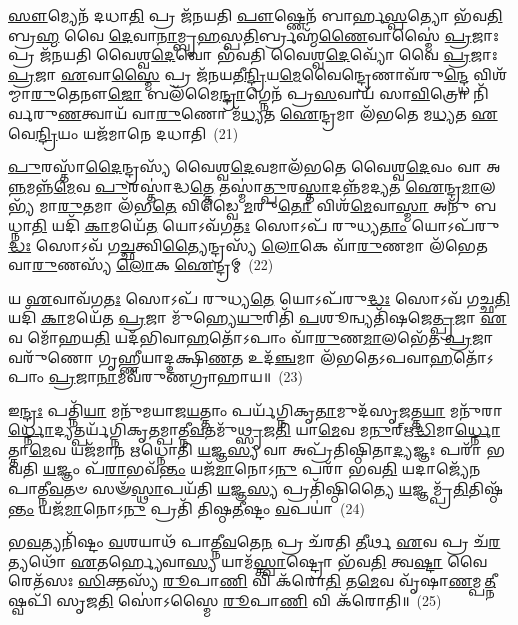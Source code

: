 \-\ul{𑌸𑍗}\-𑌮𑍍𑌯𑍇𑌨᳴ 𑌦𑌧𑌾\-\ul{𑌤𑌿} 𑌪𑍍𑌰 𑌜᳴𑌨𑌯𑌤𑌿 \ul{𑌪𑍗}\-𑌷𑍍𑌣𑍇𑌨᳴ 𑌬𑌾𑌰𑍍\mbox{}𑌹\-\ul{𑌸𑍍𑌪}\-𑌤𑍍𑌯𑍋 𑌭᳴𑌵\-\ul{𑌤𑌿} 𑌬𑍍𑌰\-\ul{𑌹𑍍𑌮} 𑌵𑍈 \ul{𑌦𑍇}\-𑌵𑌾\-\ul{𑌨𑌾}\-𑌮𑍍𑌬𑍃\-\ul{𑌹}\-𑌸𑍍𑌪\-\ul{𑌤𑌿}\-𑌰𑍍𑌬𑍍𑌰𑌹𑍍𑌮᳴\-\ul{𑌣𑍈}\-𑌵𑌾𑌸𑍍𑌮𑍈॑ \ul{𑌪𑍍𑌰}\-𑌜𑌾𑌃 𑌪𑍍𑌰 𑌜᳴𑌨𑌯𑌤𑌿 𑌵𑍈𑌶𑍍𑌵\-\ul{𑌦𑍇}\-𑌵𑍋 𑌭᳴𑌵𑌤𑌿 𑌵𑍈𑌶𑍍𑌵\-\ul{𑌦𑍇}\-𑌵𑍍𑌯𑍋᳴ 𑌵𑍈 \ul{𑌪𑍍𑌰}\-𑌜𑌾𑌃 \ul{𑌪𑍍𑌰}\-𑌜𑌾 \ul{𑌏}\-𑌵𑌾\-\ul{𑌸𑍍𑌮𑍈} 𑌪𑍍𑌰 𑌜᳴𑌨𑌯𑌤𑍀\-\ul{𑌨𑍍𑌦𑍍𑌰𑌿}\-𑌯\-\ul{𑌮𑍇}\-𑌵𑍈𑌨𑍍𑌦𑍍𑌰𑍇𑌣𑌾𑌵᳴𑌰𑍁\-\ul{𑌨𑍍𑌦𑍍𑌧𑍇} 𑌵𑌿𑌶᳴𑌮𑍍𑌮𑌾\-\ul{𑌰𑍁}\-𑌤𑍇𑌨𑍗\-\ul{𑌜𑍋} 𑌬𑌲᳴𑌮𑍈\-\ul{𑌨𑍍𑌦𑍍𑌰𑌾}\-𑌗𑍍𑌨𑍇𑌨᳴ 𑌪𑍍𑌰\-\ul{𑌸}\-𑌵𑌾𑌯᳴ 𑌸𑌾\-\ul{𑌵𑌿}\-𑌤𑍍𑌰𑍋 𑌨𑌿᳴𑌰𑍍𑌵𑌰𑍁\-\ul{𑌣}\-𑌤𑍍𑌵𑌾𑌯᳴ 𑌵𑌾\-\ul{𑌰𑍁}\-𑌣𑍋 𑌮᳴\-\ul{𑌧𑍍𑌯}\-𑌤 \ul{𑌐}\-𑌨𑍍𑌦𑍍𑌰𑌮𑌾 𑌲᳴𑌭𑌤𑍇 𑌮\-\ul{𑌧𑍍𑌯}\-𑌤 \ul{𑌏}\-𑌵𑍇\-\ul{𑌨𑍍𑌦𑍍𑌰𑌿}\-𑌯𑌂 𑌯𑌜᳴𑌮𑌾𑌨𑍇 𑌦𑌧𑌾𑌤𑌿~(21)

\-\ul{𑌪𑍁}\-𑌰𑌸𑍍𑌤𑌾᳴\-\ul{𑌦𑍈}\-𑌨𑍍𑌦𑍍𑌰𑌸𑍍𑌯᳴ 𑌵𑍈𑌶𑍍𑌵\-\ul{𑌦𑍇}\-𑌵𑌮𑌾𑌲᳴𑌭𑌤𑍇 𑌵𑍈𑌶𑍍𑌵\-\ul{𑌦𑍇}\-𑌵𑌂 𑌵𑌾 𑌅\-\ul{𑌨𑍍𑌨}\-𑌮𑌨𑍍𑌨᳴\-\ul{𑌮𑍇}\-𑌵 \ul{𑌪𑍁}\-𑌰𑌸𑍍𑌤𑌾॑𑌦𑍍𑌧\-\ul{𑌤𑍍𑌤𑍇} 𑌤𑌸𑍍𑌮𑌾॑\-\ul{𑌤𑍍𑌪𑍁}\-𑌰\-\ul{𑌸𑍍𑌤𑌾}\-𑌦𑌨𑍍𑌨᳴𑌮𑌦𑍍𑌯𑌤 \ul{𑌐}\-𑌨𑍍𑌦𑍍𑌰\-\ul{𑌮𑌾}\-𑌲𑌭𑍍𑌯᳴ 𑌮𑌾\-\ul{𑌰𑍁}\-𑌤𑌮𑌾 𑌲᳴𑌭\-\ul{𑌤𑍇} 𑌵𑌿𑌡𑍍𑌵𑍈 \ul{𑌮}\-𑌰𑍁\-\ul{𑌤𑍋} 𑌵𑌿𑌶᳴\-\ul{𑌮𑍇}\-𑌵𑌾\-\ul{𑌸𑍍𑌮𑌾} 𑌅𑌨𑍁᳴ 𑌬𑌧𑍍𑌨𑌾\-\ul{𑌤𑌿} 𑌯𑌦𑌿᳴ \ul{𑌕𑌾}\-𑌮𑌯𑍇᳴\-\ul{𑌤} 𑌯𑍋\-𑌽𑌵᳴𑌗\-\ul{𑌤𑌃} 𑌸𑍋\-𑌽𑌪᳴ 𑌰𑍁𑌧𑍍𑌯\-\ul{𑌤𑌾𑌂} 𑌯𑍋\-𑌽𑌪᳴𑌰𑍁\-\ul{𑌦𑍍𑌧𑌃} 𑌸𑍋\-𑌽𑌵᳴ 𑌗\-\ul{𑌚𑍍𑌛}\-𑌤𑍍𑌵𑌿\-\ul{𑌤𑍍𑌯𑍈}\-𑌨𑍍𑌦𑍍𑌰𑌸𑍍𑌯᳴ \ul{𑌲𑍋}\-𑌕𑍇 𑌵𑌾᳴\-\ul{𑌰𑍁}\-𑌣𑌮𑌾 𑌲᳴𑌭𑍇𑌤 𑌵𑌾\-\ul{𑌰𑍁}\-𑌣𑌸𑍍𑌯᳴ \ul{𑌲𑍋}\-𑌕 \ul{𑌐}\-𑌨𑍍𑌦𑍍𑌰𑌮𑍍~(22)

𑌯 \ul{𑌏}\-𑌵𑌾𑌵᳴𑌗\-\ul{𑌤𑌃} 𑌸𑍋\-𑌽𑌪᳴ 𑌰𑍁𑌧𑍍𑌯\-\ul{𑌤𑍇} 𑌯𑍋\-𑌽𑌪᳴𑌰𑍁\-\ul{𑌦𑍍𑌧𑌃} 𑌸𑍋\-𑌽𑌵᳴ 𑌗𑌚𑍍𑌛\-\ul{𑌤𑌿} 𑌯𑌦𑌿᳴ \ul{𑌕𑌾}\-𑌮𑌯𑍇᳴𑌤 \ul{𑌪𑍍𑌰}\-𑌜𑌾 𑌮𑍁᳴𑌹𑍍𑌯𑍇\-\ul{𑌯𑍁}\-𑌰𑌿𑌤𑌿᳴ \ul{𑌪}\-𑌶𑍂𑌨𑍍𑌵𑍍𑌯𑌤𑌿᳴𑌷𑌜𑍇\-\ul{𑌤𑍍𑌪𑍍𑌰}\-𑌜𑌾 \ul{𑌏}\-𑌵 𑌮𑍋᳴𑌹𑌯\-\ul{𑌤𑌿} 𑌯𑌦᳴𑌭𑌿𑌵𑌾\-\ul{𑌹}\-𑌤𑍋᳴\-𑌽𑌪𑌾𑌂 𑌵𑌾᳴\-\ul{𑌰𑍁}\-𑌣\-\ul{𑌮𑌾}\-𑌲𑌭𑍇᳴𑌤 \ul{𑌪𑍍𑌰}\-𑌜𑌾 𑌵𑌰𑍁᳴𑌣𑍋 𑌗𑍃𑌹𑍍𑌣𑍀𑌯𑌾𑌦𑍍𑌦𑌕𑍍𑌷𑌿\-\ul{𑌣}\-𑌤 𑌉𑌦᳴\-\ul{𑌞𑍍𑌚}\-𑌮𑌾 𑌲᳴𑌭𑌤𑍇\-𑌽𑌪𑌵𑌾\-\ul{𑌹}\-𑌤𑍋᳴\-𑌽\-𑌪𑌾𑌂 \ul{𑌪𑍍𑌰}\-𑌜𑌾\-\ul{𑌨𑌾}\-𑌮𑌵᳴𑌰𑍁𑌣𑌗𑍍𑌰𑌾𑌹𑌾𑌯॥~(23)

{\anuvakamend[{𑌰𑍇\-\ul{𑌤𑍋} 𑌯𑌜᳴𑌮𑌾𑌨𑍇 𑌦𑌧𑌾𑌤𑌿 \ul{𑌲𑍋}\-𑌕 \ul{𑌐}\-𑌨𑍍𑌦𑍍𑌰𑍞 \ul{𑌸}\-𑌪𑍍𑌤𑌤𑍍𑌰𑌿𑍞᳴𑌶𑌚𑍍𑌚}]}%

𑌇\-\ul{𑌨𑍍𑌦𑍍𑌰𑌃} 𑌪𑌤𑍍𑌨𑌿᳴\-\ul{𑌯𑌾} 𑌮𑌨𑍁᳴𑌮𑌯𑌾𑌜\-\ul{𑌯}\-𑌤𑍍𑌤𑌾𑌂 𑌪𑌰𑍍𑌯᳴𑌗𑍍𑌨𑌿𑌕𑍃\-\ul{𑌤𑌾}\-𑌮𑍁𑌦᳴𑌸𑍃\-\ul{𑌜}\-𑌤𑍍𑌤\-\ul{𑌯𑌾} 𑌮𑌨𑍁᳴𑌰𑌾\-\ul{𑌰𑍍𑌧𑍍𑌨𑍋}\-𑌦𑍍𑌯𑌤𑍍𑌪𑌰𑍍𑌯᳴𑌗𑍍𑌨𑌿𑌕𑍃𑌤𑌮𑍍𑌪𑌾𑌤𑍍𑌨𑍀\-\ul{𑌵}\-𑌤𑌮𑍁᳴\-\ul{𑌥𑍍𑌸𑍃}\-𑌜\-\ul{𑌤𑌿} 𑌯𑌾\-\ul{𑌮𑍇}\-𑌵 𑌮\-\ul{𑌨𑍁}\-𑌰𑍍\mbox{}𑌋\-\ul{𑌦𑍍𑌧𑌿}\-\-𑌮𑌾\-\ul{𑌰𑍍𑌧𑍍𑌨𑍋}\-𑌤𑍍𑌤𑌾\-\ul{𑌮𑍇}\-𑌵 𑌯𑌜᳴𑌮𑌾𑌨 𑌋𑌧𑍍𑌨𑍋𑌤𑌿 \ul{𑌯}\-𑌜𑍍𑌞\-\ul{𑌸𑍍𑌯} 𑌵𑌾 𑌅𑌪𑍍𑌰᳴𑌤𑌿𑌷𑍍𑌠𑌿𑌤𑌾\-\ul{𑌦𑍍𑌯}\-𑌜𑍍𑌞𑌃 𑌪𑌰𑌾᳴ 𑌭𑌵𑌤𑌿 \ul{𑌯}\-𑌜𑍍𑌞𑌂 𑌪᳴\-\ul{𑌰𑌾}\-𑌭𑌵᳴\-\ul{𑌨𑍍𑌤𑌂} 𑌯𑌜᳴\-\ul{𑌮𑌾}\-𑌨𑍋\-𑌽\-\ul{𑌨𑍁} 𑌪𑌰𑌾᳴ 𑌭𑌵\-\ul{𑌤𑌿} 𑌯𑌦𑌾𑌜𑍍𑌯𑍇᳴𑌨 𑌪𑌾𑌤𑍍𑌨𑍀\-\ul{𑌵}\-𑌤𑍞 𑌸𑍟᳴\-\ul{𑌸𑍍𑌥𑌾}\-𑌪𑌯᳴𑌤𑌿 \ul{𑌯}\-𑌜𑍍𑌞\-\ul{𑌸𑍍𑌯} 𑌪𑍍𑌰𑌤𑌿᳴𑌷𑍍𑌠𑌿𑌤𑍍𑌯𑍈 \ul{𑌯}\-𑌜𑍍𑌞𑌮𑍍𑌪𑍍𑌰᳴\-\ul{𑌤𑌿}\-𑌤𑌿𑌷𑍍𑌠᳴\-\ul{𑌨𑍍𑌤𑌂} 𑌯𑌜᳴\-\ul{𑌮𑌾}\-𑌨𑍋\-𑌽\-\ul{𑌨𑍁} 𑌪𑍍𑌰𑌤𑌿᳴ 𑌤𑌿𑌷𑍍𑌠\-\ul{𑌤𑍀}\-𑌷𑍍𑌟𑌂 \ul{𑌵}\-𑌪𑌯𑌾॑~(24)

𑌭\-\ul{𑌵}\-𑌤𑍍𑌯𑌨𑌿᳴𑌷𑍍𑌟𑌂 \ul{𑌵}\-𑌶𑌯𑌾𑌥᳴ 𑌪𑌾𑌤𑍍𑌨𑍀\-\ul{𑌵}\-𑌤𑍇\-\ul{𑌨} 𑌪𑍍𑌰 𑌚᳴𑌰𑌤𑌿 \ul{𑌤𑍀}\-𑌰𑍍𑌥 \ul{𑌏}\-𑌵 𑌪𑍍𑌰 𑌚᳴\-\ul{𑌰}\-𑌤𑍍𑌯𑌥𑍋᳴ \ul{𑌏}\-𑌤𑌰𑍍\mbox{}\-\ul{𑌹𑍍𑌯𑍇}\-𑌵𑌾\-\ul{𑌸𑍍𑌯} 𑌯𑌾𑌮᳴\-\ul{𑌸𑍍𑌤𑍍𑌵𑌾}\-𑌷𑍍𑌟𑍍𑌰𑍋 𑌭᳴𑌵\-\ul{𑌤𑌿} 𑌤𑍍𑌵\-\ul{𑌷𑍍𑌟𑌾} 𑌵𑍈 𑌰𑍇𑌤᳴𑌸𑌃 \ul{𑌸𑌿}\-𑌕𑍍𑌤𑌸𑍍𑌯᳴ \ul{𑌰𑍂}\-𑌪𑌾\-\ul{𑌣𑌿} 𑌵𑌿 𑌕᳴𑌰𑍋\-\ul{𑌤𑌿} 𑌤\-\ul{𑌮𑍇}\-𑌵 𑌵𑍃᳴𑌷𑌾\-\ul{𑌣}\-𑌮𑍍𑌪\-\ul{𑌤𑍍𑌨𑍀}\-𑌷𑍍𑌵𑌪𑌿᳴ 𑌸𑍃𑌜\-\ul{𑌤𑌿} 𑌸𑍋॑\-𑌽𑌸𑍍𑌮𑍈 \ul{𑌰𑍂}\-𑌪𑌾\-\ul{𑌣𑌿} 𑌵𑌿 𑌕᳴𑌰𑍋𑌤𑌿॥~(25)

